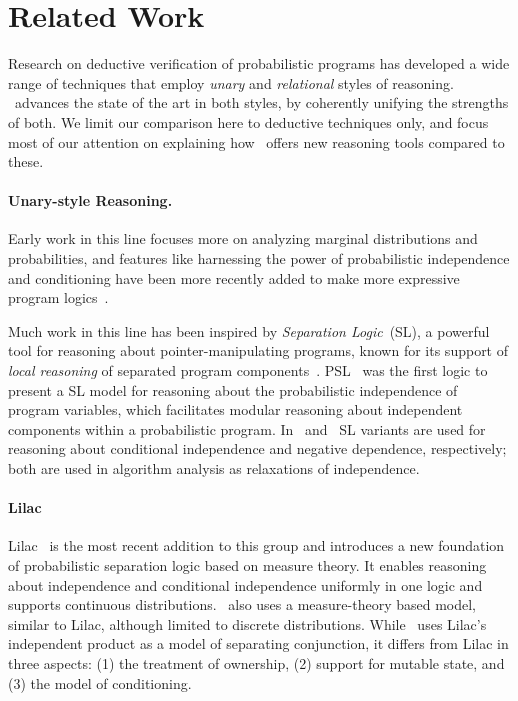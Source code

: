 \section{Related Work}
\label{sec:relwork}





Research on deductive verification of probabilistic programs has developed a
wide range of techniques that employ {\em unary} and  {\em relational} styles of reasoning. \thelogic\ advances the state of the art in both styles, by coherently unifying the strengths of both. We limit our comparison here to deductive techniques only, and focus most of our attention on explaining how \thelogic\ offers new  reasoning tools compared to these.


\paragraph{\bfseries Unary-style Reasoning.}
Early work in this line focuses more on analyzing marginal distributions and probabilities, and features like harnessing the power of  probabilistic independence and conditioning have been more recently added to make more expressive program logics~\cite{ramshaw1979formalizing,rand2015vphl,barthe2016ellora,barthe2019probabilistic,bao2022separation,lilac}.

Much work in this line has been inspired by {\em Separation Logic}~(SL),
a powerful tool
for reasoning about pointer-manipulating programs,
known for its support of \emph{local reasoning}
of separated program components~\cite{reynolds2000intuitionistic}.
PSL~\cite{barthe2019probabilistic} was the first logic to present a SL model for reasoning about the probabilistic independence of program variables, which facilitates modular reasoning about independent components within a probabilistic program.
In~\cite{bao2021bunched} and~\cite{bao2022separation} SL variants are used for reasoning about conditional independence and negative dependence, respectively;
both are used in algorithm analysis as relaxations of
independence.

\paragraph{Lilac}
Lilac~\cite{lilac} is the most recent addition to this group and introduces a new foundation of probabilistic separation logic based on measure theory.
It enables reasoning about independence and conditional independence uniformly in one logic and supports continuous distributions.
\thelogic\ also uses a measure-theory based model, similar to Lilac,
although limited to discrete distributions.
While \thelogic\ uses Lilac's independent product as a model of separating conjunction, it differs from Lilac in three aspects:
(1) the treatment of ownership,
(2) support for mutable state, and
(3) the model of conditioning.

